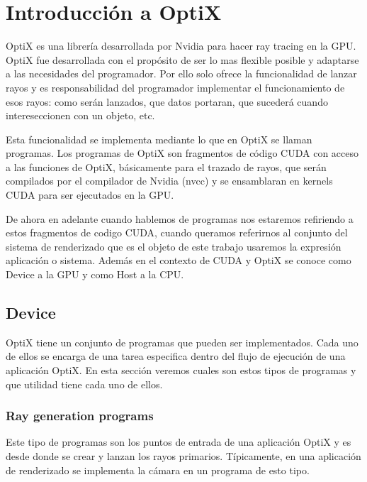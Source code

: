 \chapter{Introducción a OptiX}


OptiX es una librería desarrollada por Nvidia para hacer ray tracing en la GPU. OptiX fue desarrollada con el propósito de ser lo mas flexible posible y adaptarse a las necesidades del programador. Por ello solo ofrece la funcionalidad de lanzar rayos y es responsabilidad del programador implementar el funcionamiento de esos rayos: como serán lanzados, que datos portaran, que sucederá cuando intereseccionen con un objeto, etc.

\medskip

Esta funcionalidad se implementa mediante lo que en OptiX se llaman programas. Los programas de OptiX son fragmentos de código CUDA con acceso a las funciones de OptiX, básicamente para el trazado de rayos, que serán compilados por el compilador de Nvidia (nvcc) y se ensamblaran en kernels CUDA para ser ejecutados en la GPU. 

\medskip
De ahora en adelante cuando hablemos de programas nos estaremos refiriendo a estos fragmentos de codigo CUDA, cuando queramos referirnos al conjunto del sistema de renderizado que es el objeto de este trabajo usaremos la expresión aplicación o sistema. Además en el contexto de CUDA y OptiX se conoce como Device a la GPU y como Host a la CPU.

\clearpage

\section{Device}

OptiX tiene un conjunto de programas que pueden ser implementados. Cada uno de ellos se encarga de una tarea especifica dentro del flujo de ejecución de una aplicación OptiX. En esta sección veremos cuales son estos tipos de programas y que utilidad tiene cada uno de ellos.  

\subsection{Ray generation programs}

Este tipo de programas son los puntos de entrada de una aplicación OptiX y es desde donde se crear y lanzan los rayos primarios. Típicamente, en una aplicación de renderizado se implementa la cámara en un programa de esto tipo.

